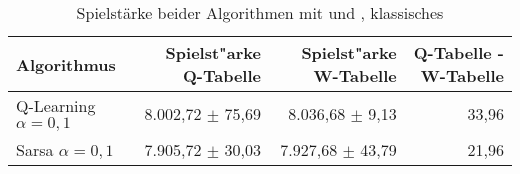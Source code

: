 \begin{table}
\centering
\caption[Spielstärke beider Algorithmen mit \qtable und \wtable, klassisches \splay]{Spielstärke beider Algorithmen mit \qtable und \wtable, klassisches \splay}
\label{tab:playingAbility_compareAlgorithms_experience}

\begin{tabular}{lrrr}
\toprule
Algorithmus                & Spielst"arke Q-Tabelle     & Spielst"arke W-Tabelle              & Q-Tabelle - W-Tabelle \\ \midrule
Q-Learning $\alpha=0,1$    & 8.002,72 $\pm$ 75,69      & 8.036,68 $\pm$ \phantom{0}9,13    & 33,96 \\
Sarsa $\alpha=0,1$         & 7.905,72 $\pm$ 30,03      & 7.927,68 $\pm$ 43,79               & 21,96 \\ \bottomrule
\end{tabular}
\end{table}